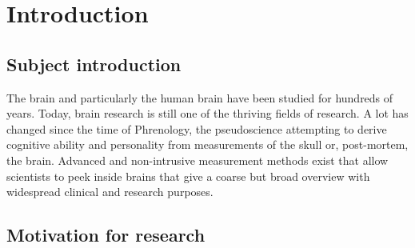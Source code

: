 \documentclass[a4paper, 10pt, english, onecolumn]{article}
\title{\fontfamily{phv}\selectfont{Causal Discovery methods for Effective Connectivity in Human Brains}}
\author{
  \textbf{R. Janssen} - \href{mailto:ramon.janssen@student.ru.nl}{ramon.janssen@student.ru.nl} \\
  \textbf{T. de Ruijter} - \href{mailto:t.deruijter@student.ru.nl}{t.deruijter@student.ru.nl}\\
}
\date{\fontfamily{ptm}\selectfont{\small{\bfseries{\today - Radboud
Universiteit Nijmegen}}}\\[0.5cm]\rule{\linewidth}{0.3mm}}
\begin{document}
\maketitle

\setlength{\parindent}{0.0cm}
\setlength{\parskip}{3mm plus2mm minus1.5mm}

\begin{abstract}
\end{abstract}

\section{Introduction}
\subsection{Subject introduction}

The brain and particularly the human brain have been studied for hundreds of years.
Today, brain research is still one of the thriving fields of research.
A lot has changed since the time of Phrenology, the pseudoscience attempting to derive cognitive ability and personality from measurements of the skull or, post-mortem, the brain.
Advanced and non-intrusive measurement methods exist that allow scientists to peek inside brains that give a coarse but broad overview with widespread clinical and research purposes.


\subsection{ Motivation for research}
\end{document}
